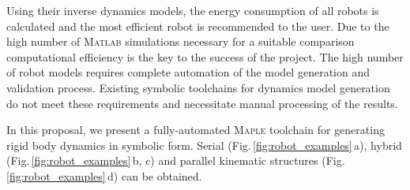 \documentclass[runningheads]{llncs}
\begin{document}
Using their inverse dynamics models, the energy consumption of all robots is calculated
and the most efficient robot is recommended to the user.
%
Due to the high number of \textsc{Matlab} simulations necessary for a suitable comparison computational efficiency is the key to the success of the project.
The high number of robot models requires complete automation of the model generation and validation process.
Existing symbolic toolchains for dynamics model generation do not meet these requirements and necessitate manual processing of the results.


In this proposal, we present a fully-automated \textsc{Maple} toolchain for generating rigid body dynamics in symbolic form.
Serial (Fig.\,\ref{fig:robot_examples}\,a), hybrid (Fig.\,\ref{fig:robot_examples}\,b, c) and parallel kinematic structures (Fig.\,\ref{fig:robot_examples}\,d) can be obtained.

\end{document}
